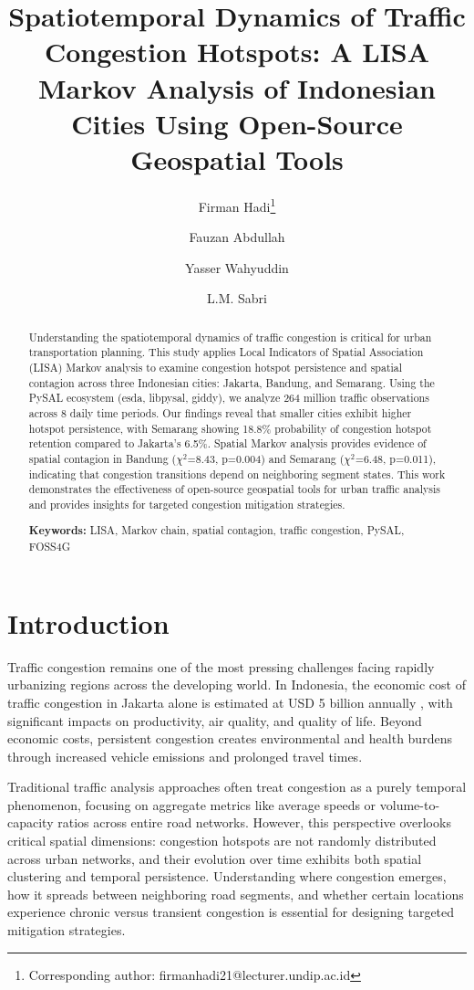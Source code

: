 \documentclass[11pt,a4paper]{article}
\title{\textbf{Spatiotemporal Dynamics of Traffic Congestion Hotspots: A LISA Markov Analysis of Indonesian Cities Using Open-Source Geospatial Tools}}
\author[1]{Firman Hadi\thanks{Corresponding author: firmanhadi21@lecturer.undip.ac.id}}
\author[2]{Fauzan Abdullah}
\author[1]{Yasser Wahyuddin}
\author[1]{L.M. Sabri}
\affil[1]{Department of Geodetic Engineering, Universitas Diponegoro, Semarang, Indonesia}
\affil[2]{Department of Statistics, Faculty of Sciences and Mathematics, Universitas Diponegoro, Semarang, Indonesia}
\date{}
\begin{document}
\maketitle

\begin{abstract}
Understanding the spatiotemporal dynamics of traffic congestion is critical for urban transportation planning. This study applies Local Indicators of Spatial Association (LISA) Markov analysis to examine congestion hotspot persistence and spatial contagion across three Indonesian cities: Jakarta, Bandung, and Semarang. Using the PySAL ecosystem (esda, libpysal, giddy), we analyze 264 million traffic observations across 8 daily time periods. Our findings reveal that smaller cities exhibit higher hotspot persistence, with Semarang showing 18.8\% probability of congestion hotspot retention compared to Jakarta's 6.5\%. Spatial Markov analysis provides evidence of spatial contagion in Bandung ($\chi^2$=8.43, p=0.004) and Semarang ($\chi^2$=6.48, p=0.011), indicating that congestion transitions depend on neighboring segment states. This work demonstrates the effectiveness of open-source geospatial tools for urban traffic analysis and provides insights for targeted congestion mitigation strategies.

\textbf{Keywords:} LISA, Markov chain, spatial contagion, traffic congestion, PySAL, FOSS4G
\end{abstract}

\section{Introduction}

Traffic congestion remains one of the most pressing challenges facing rapidly urbanizing regions across the developing world. In Indonesia, the economic cost of traffic congestion in Jakarta alone is estimated at USD 5 billion annually \cite{worldbank2020}, with significant impacts on productivity, air quality, and quality of life. Beyond economic costs, persistent congestion creates environmental and health burdens through increased vehicle emissions and prolonged travel times.

Traditional traffic analysis approaches often treat congestion as a purely temporal phenomenon, focusing on aggregate metrics like average speeds or volume-to-capacity ratios across entire road networks. However, this perspective overlooks critical spatial dimensions: congestion hotspots are not randomly distributed across urban networks, and their evolution over time exhibits both spatial clustering and temporal persistence. Understanding where congestion emerges, how it spreads between neighboring road segments, and whether certain locations experience chronic versus transient congestion is essential for designing targeted mitigation strategies.
\end{document}
